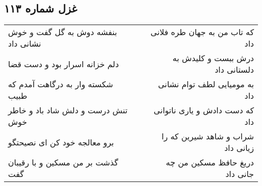 \begin{center}
\section*{غزل شماره ۱۱۳}
\label{sec:sh113}
\begin{longtable}{l p{0.5cm} r}
بنفشه دوش به گل گفت و خوش نشانی داد
&&
که تاب من به جهان طره فلانی داد
\\
دلم خزانه اسرار بود و دست قضا
&&
درش ببست و کلیدش به دلستانی داد
\\
شکسته وار به درگاهت آمدم که طبیب
&&
به مومیایی لطف توام نشانی داد
\\
تنش درست و دلش شاد باد و خاطر خوش
&&
که دست دادش و یاری ناتوانی داد
\\
برو معالجه خود کن ای نصیحتگو
&&
شراب و شاهد شیرین که را زیانی داد
\\
گذشت بر من مسکین و با رقیبان گفت
&&
دریغ حافظ مسکین من چه جانی داد
\\
\end{longtable}
\end{center}

